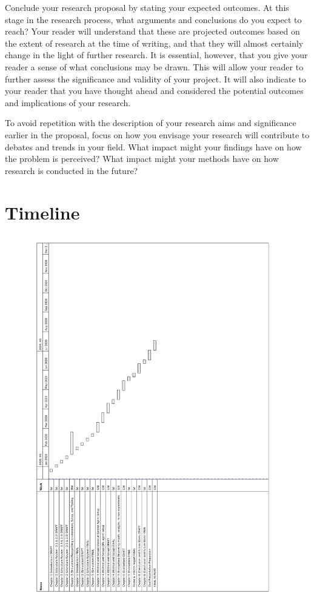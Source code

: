 \documentclass[12pt, a4paper]{article}
\begin{document}
Conclude your research proposal by stating your expected outcomes. At this stage in the research process, what arguments and conclusions do you expect to reach? Your reader will understand that these are projected outcomes based on the extent of research at the time of writing, and that they will almost certainly change in the light of further research. It is essential, however, that you give your reader a sense of what conclusions may be drawn. This will allow your reader to further assess the significance and validity of your project. It will also indicate to your reader that you have thought ahead and considered the potential outcomes and implications of your research.

To avoid repetition with the description of your research aims and significance earlier in the proposal, focus on how you envisage your research will contribute to debates and trends in your field. What impact might your findings have on how the problem is perceived? What impact might your methods have on how research is conducted in the future?

\clearpage

\section{Timeline}
\vspace{2cm}
\begin{figure}[h]
	\centering
	\includegraphics[scale=0.62]{./project_plan/project_plan}
\end{figure}
\end{document}
